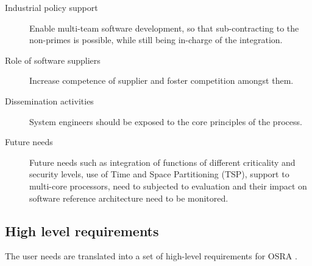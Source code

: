 \begin{description}
\item [Industrial policy support] Enable multi-team software development, so that sub-contracting to the non-primes is possible, while still being in-charge of the integration.

\item [Role of software suppliers] Increase competence of supplier and foster competition amongst them. 

\item [Dissemination activities] System engineers should be exposed to the core principles of the process.

\item [Future needs] Future needs such as integration of functions of different criticality and security levels, use of Time and Space Partitioning (TSP), support to multi-core processors, need to subjected to evaluation and their impact on software reference architecture need to be monitored.
\end{description} 

\subsection{High level requirements}
\label{subsection: High level requirements}
The user needs are translated into a set of high-level requirements for OSRA \cite{SAVOIR} \cite{PhdThesis}.

